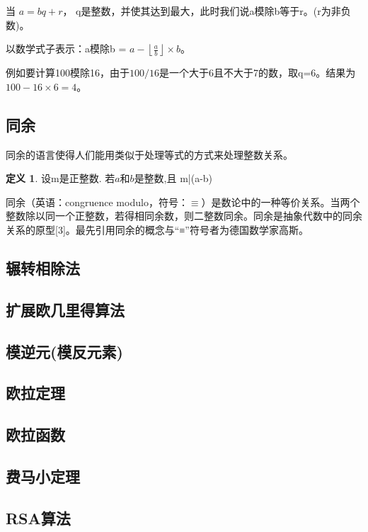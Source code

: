 \documentclass{article}
\theoremstyle{definition}
\newtheorem{dfn}{定义}[section]
\theoremstyle{remark}
\theoremstyle{plain}
\begin{document}
当 $a = bq + r$， q是整数，并使其达到最大，此时我们说a模除b等于r。(r为非负数)。

以数学式子表示：a模除b = $a-\left\lfloor \frac{a}{b}\right\rfloor \times b$。

例如要计算100模除16，由于$100/16$是一个大于6且不大于7的数，取q=6。结果为$100-16\times6=4$。



\subsection{同余}   
同余的语言使得人们能用类似于处理等式的方式来处理整数关系。

\begin{dfn}
设m是正整数. 若$a$和$b$是整数,且 m|(a-b)
\end{dfn}

同余\cite{WEBSITE:congruence_modulo}（英语：congruence modulo，符号：$\equiv$）是数论中的一种等价关系。当两个整数除以同一个正整数，若得相同余数，则二整数同余。同余是抽象代数中的同余关系的原型[3]。最先引用同余的概念与“≡”符号者为德国数学家高斯。


\subsection{辗转相除法}   
\subsection{扩展欧几里得算法}   
\subsection{模逆元(模反元素)}   
\subsection{欧拉定理}   
\subsection{欧拉函数}   
\subsection{费马小定理}   
\subsection{RSA算法}   
 

 

\end{document}
